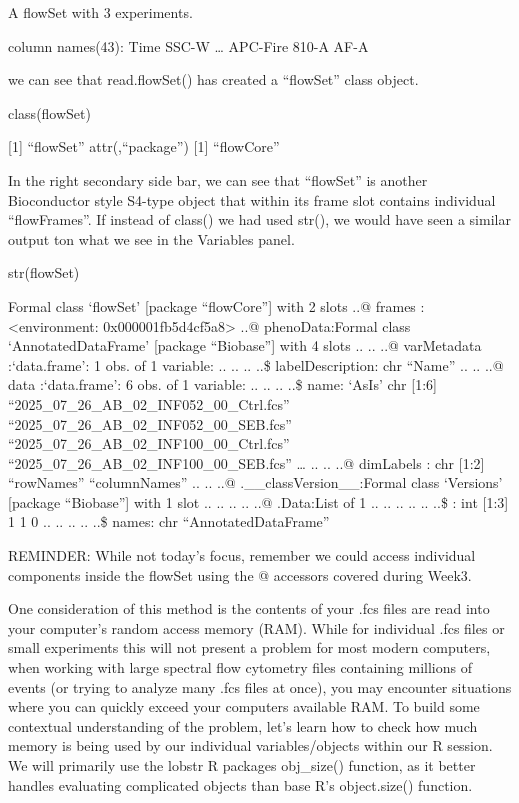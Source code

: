 \documentclass[
  letterpaper,
  DIV=11,
  numbers=noendperiod]{scrartcl}
\newenvironment{Shaded}{\begin{snugshade}}{\end{snugshade}}
\newcommand{\FunctionTok}[1]{\textcolor[rgb]{0.28,0.35,0.67}{#1}}
\newcommand{\NormalTok}[1]{\textcolor[rgb]{0.00,0.23,0.31}{#1}}
\begin{document}
A flowSet with 3 experiments.

column names(43): Time SSC-W \ldots{} APC-Fire 810-A AF-A

we can see that read.flowSet() has created a ``flowSet'' class object.

\begin{Shaded}
\begin{Highlighting}[]
\FunctionTok{class}\NormalTok{(flowSet)}
\end{Highlighting}
\end{Shaded}

{[}1{]} ``flowSet'' attr(,``package'') {[}1{]} ``flowCore''

In the right secondary side bar, we can see that ``flowSet'' is another
Bioconductor style S4-type object that within its frame slot contains
individual ``flowFrames''. If instead of class() we had used str(), we
would have seen a similar output ton what we see in the Variables panel.

\begin{Shaded}
\begin{Highlighting}[]
\FunctionTok{str}\NormalTok{(flowSet)}
\end{Highlighting}
\end{Shaded}

Formal class `flowSet' {[}package ``flowCore''{]} with 2 slots ..@
frames :\textless environment: 0x000001fb5d4cf5a8\textgreater{} ..@
phenoData:Formal class `AnnotatedDataFrame' {[}package ``Biobase''{]}
with 4 slots .. .. ..@ varMetadata :`data.frame': 1 obs. of 1 variable:
.. .. .. ..\$ labelDescription: chr ``Name'' .. .. ..@ data
:`data.frame': 6 obs. of 1 variable: .. .. .. ..\$ name: `AsIs' chr
{[}1:6{]} ``2025\_07\_26\_AB\_02\_INF052\_00\_Ctrl.fcs''
``2025\_07\_26\_AB\_02\_INF052\_00\_SEB.fcs''
``2025\_07\_26\_AB\_02\_INF100\_00\_Ctrl.fcs''
``2025\_07\_26\_AB\_02\_INF100\_00\_SEB.fcs'' \ldots{} .. .. ..@
dimLabels : chr {[}1:2{]} ``rowNames'' ``columnNames'' .. .. ..@
.\_\_classVersion\_\_:Formal class `Versions' {[}package ``Biobase''{]}
with 1 slot .. .. .. .. ..@ .Data:List of 1 .. .. .. .. .. ..\$ : int
{[}1:3{]} 1 1 0 .. .. .. .. ..\$ names: chr ``AnnotatedDataFrame''

REMINDER: While not today's focus, remember we could access individual
components inside the flowSet using the @ accessors covered during
Week3.

One consideration of this method is the contents of your .fcs files are
read into your computer's random access memory (RAM). While for
individual .fcs files or small experiments this will not present a
problem for most modern computers, when working with large spectral flow
cytometry files containing millions of events (or trying to analyze many
.fcs files at once), you may encounter situations where you can quickly
exceed your computers available RAM. To build some contextual
understanding of the problem, let's learn how to check how much memory
is being used by our individual variables/objects within our R session.
We will primarily use the lobstr R packages obj\_size() function, as it
better handles evaluating complicated objects than base R's
object.size() function.
\end{document}
